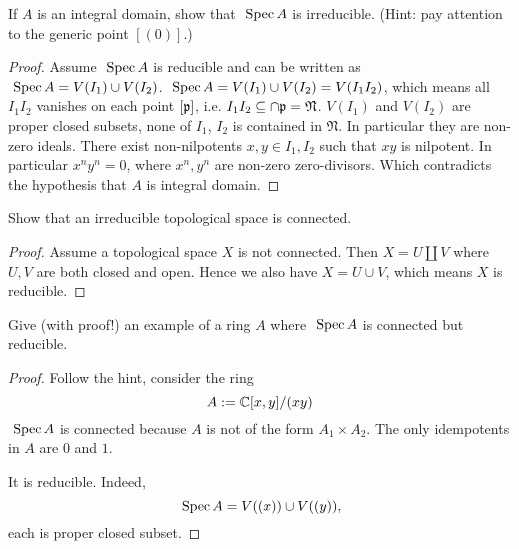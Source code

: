 \begin{exr}\label{chap3exr:Integral_domain_irreducible}
If $A$ is an integral domain, show that $\text{ Spec\,} A$ is irreducible. (Hint: pay attention to the generic point $[(0)]$.)
\end{exr}
\begin{proof}
Assume $\text{ Spec\,} A$ is reducible and can be written as $\text{ Spec\,} A=V(I_1)\cup V(I_2)$.
$\text{ Spec\,} A=V(I_1)\cup V(I_2)=V(I_1 I_2)$, which means all $I_1I_2$ vanishes on each point $[{\mathfrak p}]$, i.e. $I_1I_2\subseteq\cap {\mathfrak p}=\mathfrak{N}$. $V(I_1)$ and $V(I_2)$ are proper closed subsets, none of $I_1$, $I_2$ is contained in $\mathfrak{N}$. In particular they are non-zero ideals. There exist non-nilpotents $x,y\in I_1,I_2$ such that $xy$ is nilpotent. In particular $x^ny^n=0$, where $x^n, y^n$ are non-zero zero-divisors. Which contradicts the hypothesis that $A$ is integral domain.
\end{proof}

\begin{exr}\label{chap3exr:irreducible_topological_space_connected}
Show that an irreducible topological space is connected.
\end{exr}
\begin{proof}
Assume a topological space $X$ is not connected. Then $X=U\coprod V$ where $U, V$ are both closed and open. Hence we also have $X=U\cup V$, which means $X$ is reducible. 
\end{proof}

\begin{exr}
Give (with proof!) an example of a ring $A$ where $\text{ Spec\,} A$ is connected but reducible.
\end{exr}
\begin{proof}
Follow the hint, consider the ring 
$$
A:=\mathbb C[x,y]/(xy)
$$
$\text{ Spec\,} A$ is connected because $A$ is not of the form $A_1\times A_2$. The only idempotents in $A$ are $0$ and $1$.

It is reducible. Indeed,
$$
\text{ Spec\,} A=V((x))\cup V((y)),
$$
each is proper closed subset.
\end{proof}

